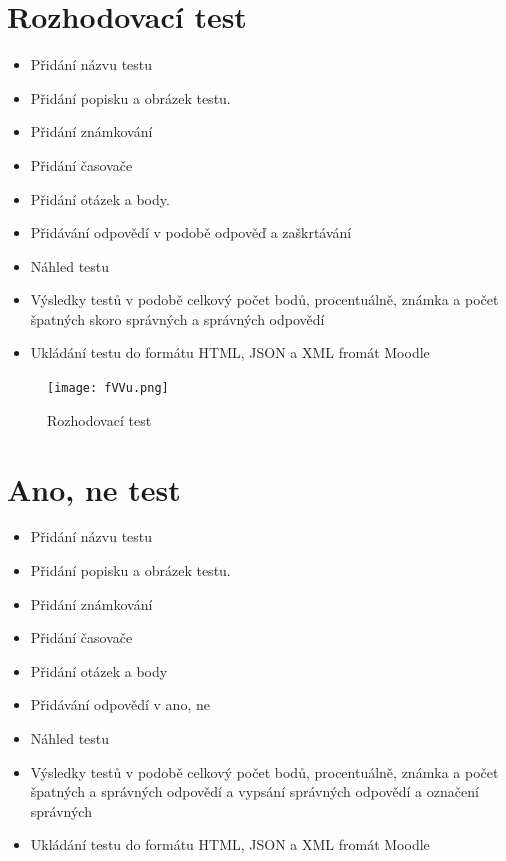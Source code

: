 \documentclass[12pt, a4paper, twoside, openright]{report}
\begin{document}
\section{Rozhodovací test}
	\begin{itemize}
		\item Přidání názvu testu
		\item Přidání popisku a obrázek testu.
		\item Přidání známkování
		\item Přidání časovače
            \item Přidání otázek a body.
            \item Přidávání odpovědí v podobě odpověď a zaškrtávání
            \item Náhled testu
            \item Výsledky testů v podobě celkový počet bodů, procentuálně, známka a počet špatných skoro správných a správných odpovědí
            \item Ukládání testu do formátu HTML, JSON a XML fromát Moodle
	\end{itemize}

    \begin{figure}[h]
		\centering
		\texttt{[image: fVVu.png]}
		\caption{Rozhodovací test}
		\label{fig:architecture}
	\end{figure}


\section{Ano, ne test}
	\begin{itemize}
		\item Přidání názvu testu
		\item Přidání popisku a obrázek testu.
		\item Přidání známkování
		\item Přidání časovače
            \item Přidání otázek a body
            \item Přidávání odpovědí v ano, ne
            \item Náhled testu
            \item Výsledky testů v podobě celkový počet bodů, procentuálně, známka a počet špatných a správných odpovědí a vypsání správných odpovědí a označení správných
            \item Ukládání testu do formátu HTML, JSON a XML fromát Moodle
	\end{itemize}
\end{document}
